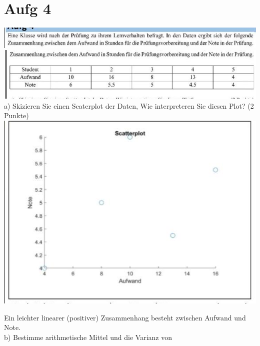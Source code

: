 \documentclass[10pt]{article}
\begin{document}
{\section*{Aufg 4}
\includegraphics[width=\linewidth]{images/2024_12_29_0906b02acf849bda8665g-5(12)}\\
\includegraphics[width=\linewidth]{images/2024_12_29_0906b02acf849bda8665g-5(14)}\\
a) Skizieren Sie einen Scaterplot der Daten, Wie interpreteren Sie diesen Plot? (2 Punkte)\\
\includegraphics[width=\linewidth]{images/2024_12_29_0906b02acf849bda8665g-5(11)}

Ein leichter linearer (positiver) Zusammenhang besteht zwischen Aufwand und Note.\\
b) Bestimme arithmetische Mittel und die Varianz von

}
\end{document}
